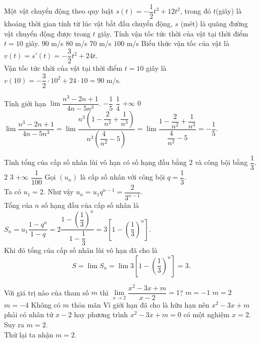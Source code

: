 \begin{ex}%
 Một vật chuyển động theo quy luật $s(t) = -\dfrac{1}{2} t^3 + 12t^2$, trong đó $t$(giây) là khoảng thời gian tính từ lúc vật bắt đầu chuyển động, $s$ (mét) là quãng đường vật chuyển động được trong $t$ giây. Tính vận tốc tức thời của vật tại thời điểm $t = 10$ giây.
 \choice
  {\True $90$ m/s}
  {$80$ m/s}
  {$70$ m/s}
  {$100$ m/s}
 \loigiai
  {
  Biểu thức vận tốc của vật là $v(t) = s'(t) = -\dfrac{3}{2}t^2 + 24 t$.\\
  Vận tốc tức thời của vật tại thời điểm $t = 10$ giây là $v(10) = -\dfrac{3}{2} \cdot 10^2 + 24 \cdot 10 = 90 \textrm{ m/s}$.
  }
\end{ex}


\begin{ex}%
 Tính giới hạn $\lim \dfrac{n^3 - 2n + 1}{4n - 5n^3}$.
 \choice
  {\True $-\dfrac{1}{5}$}
  {$\dfrac{1}{4}$}
  {$+\infty$}
  {$0$}
 \loigiai
  {
  $\lim \dfrac{n^3 - 2n + 1}{4n - 5n^3} = \lim \dfrac{n^3 \left( 1 - \dfrac{2}{n^2} + \dfrac{1}{n^3} \right)}{n^3 \left( \dfrac{4}{n^2} - 5 \right)} = \lim \dfrac{1 - \dfrac{2}{n^2} + \dfrac{1}{n^3}}{\dfrac{4}{n^2} - 5} = -\dfrac{1}{5}$.
  }
\end{ex}


\begin{ex}%
 Tính tổng của cấp số nhân lùi vô hạn có số hạng đầu bằng $2$ và công bội bằng $\dfrac{1}{3}$.
 \choice
  {$2$}
  {\True $3$}
  {$+\infty$}
  {$\dfrac{1}{100}$}
 \loigiai
  {
  Gọi $(u_n)$ là cấp số nhân với công bội $q = \dfrac{1}{3}$.\\
  Ta có $u_1 = 2$. Như vậy $u_n = u_1q^{n-1} = \dfrac{2}{3^{n-1}}$.\\
  Tổng của $n$ số hạng đầu của cấp số nhân là $S_n = u_1\dfrac{1-q^n}{1-q} = 2\dfrac{1 - \left(\dfrac{1}{3}\right)^n}{1 - \dfrac{1}{3}} = 3\left[1 - \left(\dfrac{1}{3}\right)^n\right]$.\\
  Khi đó tổng của cấp số nhân lùi vô hạn đã cho là
  $$S = \lim S_n = \lim 3\left[1 - \left(\dfrac{1}{3}\right)^n\right] = 3.$$
  }
\end{ex}


\begin{ex}%
 Với giá trị nào của tham số $m$ thì $\lim\limits_{x \to 2}\dfrac{x^2-3x+m}{x-2} = 1$?
 \choice
  {$m=-1$}
  {\True $m=2$}
  {$m=-4$}
  {Không có $m$ thỏa mãn}
 \loigiai
  {
  Vì giới hạn đã cho là hữu hạn nên $x^2 - 3x + m$ phải có nhân tử $x-2$ hay phương trình $x^2 - 3x + m = 0$ có một nghiệm $x = 2$. Suy ra $m = 2$.\\
  Thử lại ta nhận $m = 2$.
  }
\end{ex}


